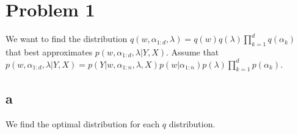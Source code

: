 \documentclass[twoside]{homework}
\begin{document}
\maketitle

\section*{Problem 1}
We want to find the distribution $q(w, \alpha_{1:d}, \lambda) = q(w) q(\lambda) \prod_{k=1}^d q(\alpha_k)$ that best approximates $p(w, \alpha_{1:d}, \lambda | Y,  X)$. Assume that $p(w, \alpha_{1:d}, \lambda | Y,  X) = p(Y | w, \alpha_{1:n}, \lambda, X) p(w | \alpha_{1:n}) p(\lambda) \prod_{k=1}^d p(\alpha_k)$.

\subsection*{a}
We find the optimal distribution for each $q$ distribution.
\end{document}
